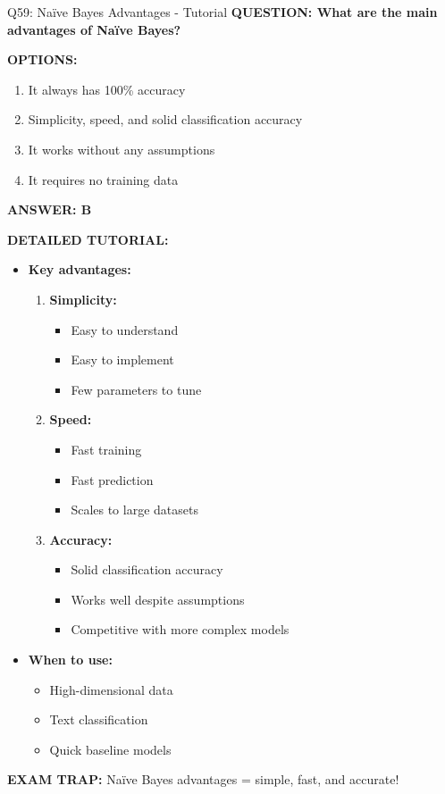 \documentclass[8pt]{beamer}
\begin{document}
	\begin{frame}{Q59: Naïve Bayes Advantages - Tutorial}
		\fontsize{6.5}{7.5}\selectfont
		\textbf{QUESTION: What are the main advantages of Naïve Bayes?}
		
		\vspace{0.1cm}
		\textbf{OPTIONS:}
		\begin{enumerate}
			\item It always has 100\% accuracy
			\item Simplicity, speed, and solid classification accuracy
			\item It works without any assumptions
			\item It requires no training data
		\end{enumerate}
		
		\vspace{0.1cm}
		\textcolor{myblue}{\textbf{ANSWER: B}}
		
		\vspace{0.1cm}
		\textbf{DETAILED TUTORIAL:}
		\begin{itemize}
			\item \textbf{Key advantages:}
			\begin{enumerate}
				\item \textbf{Simplicity:}
				\begin{itemize}
					\item Easy to understand
					\item Easy to implement
					\item Few parameters to tune
				\end{itemize}
				\item \textbf{Speed:}
				\begin{itemize}
					\item Fast training
					\item Fast prediction
					\item Scales to large datasets
				\end{itemize}
				\item \textbf{Accuracy:}
				\begin{itemize}
					\item Solid classification accuracy
					\item Works well despite assumptions
					\item Competitive with more complex models
				\end{itemize}
			\end{enumerate}
			\item \textbf{When to use:}
			\begin{itemize}
				\item High-dimensional data
				\item Text classification
				\item Quick baseline models
			\end{itemize}
		\end{itemize}
		
		\textcolor{myred}{\textbf{EXAM TRAP:}} Naïve Bayes advantages = \textcolor{myblue}{simple, fast, and accurate}!
	\end{frame}
	
\end{document}
